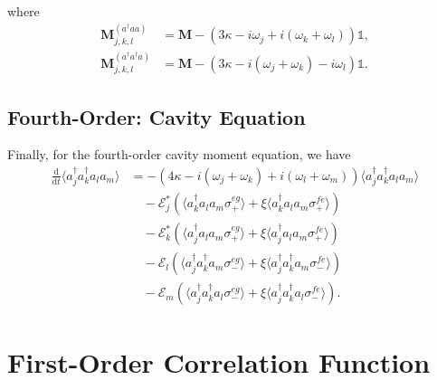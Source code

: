 \documentclass{article}
\newcommand{\ddt}[1][]{\frac{\mathrm{d} #1}{\mathrm{d}t}}
\begin{document}
where
\begin{subequations}
\begin{align}
	\bm{M}_{j, k, l}^{(a^{\dagger} a a)} &= \bm{M} - \left( 3 \kappa - i \omega_{j} + i \left( \omega_{k} + \omega_{l} \right) \right) \mathbb{1}, \\
	\bm{M}_{j, k, l}^{(a^{\dagger} a^{\dagger} a)} &= \bm{M} - \left( 3 \kappa - i \left( \omega_{j} + \omega_{k} \right) - i \omega_{l} \right) \mathbb{1}.
\end{align}
\end{subequations}

\subsection{Fourth-Order: Cavity Equation}

Finally, for the fourth-order cavity moment equation, we have
\begin{align}
	\ddt \langle a^{\dagger}_{j} a^{\dagger}_{k} a_{l} a_{m} \rangle &= -\left( 4 \kappa - i \left( \omega_{j} + \omega_{k} \right) + i \left( \omega_{l} + \omega_{m} \right) \right) \langle a^{\dagger}_{j} a^{\dagger}_{k} a_{l} a_{m} \rangle \nonumber \\
	&\quad - \mathcal{E}_{j}^{*} \left( \langle a^{\dagger}_{k} a_{l} a_{m} \sigma^{eg}_{+} \rangle + \xi \langle a^{\dagger}_{k} a_{l} a_{m} \sigma^{fe}_{+} \rangle \right) \nonumber \\
	&\quad - \mathcal{E}_{k}^{*} \left( \langle a^{\dagger}_{j} a_{l} a_{m} \sigma^{eg}_{+} \rangle + \xi \langle a^{\dagger}_{j} a_{l} a_{m} \sigma^{fe}_{+} \rangle \right) \nonumber \\
	&\quad - \mathcal{E}_{l} \left( \langle a^{\dagger}_{j} a^{\dagger}_{k} a_{m} \sigma^{eg}_{-} \rangle + \xi \langle a^{\dagger}_{j} a^{\dagger}_{k} a_{m} \sigma^{fe}_{-} \rangle \right) \nonumber \\
	&\quad - \mathcal{E}_{m} \left( \langle a^{\dagger}_{j} a^{\dagger}_{k} a_{l} \sigma^{eg}_{-} \rangle + \xi \langle a^{\dagger}_{j} a^{\dagger}_{k} a_{l} \sigma^{fe}_{-} \rangle \right).
\end{align}

\section{First-Order Correlation Function}
\end{document}
